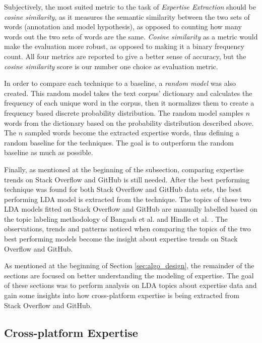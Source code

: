            Subjectively, the most suited metric to the task of \emph{Expertise Extraction} should be \emph{cosine similarity}, as it measures the semantic similarity between the two sets of words (annotation and model hypothesis), as opposed to counting how many words out the two sets of words are the same. \emph{Cosine similarity} as a metric would make the evaluation more robust, as opposed to making it a binary frequency count. All four metrics are reported to give a better sense of accuracy, but the \emph{cosine similarity} score is our number one choice as evaluation metric.
            
            \label{subsec:random_model}In order to compare each technique to a baseline, a \emph{random model} was also created. This random model takes the text corpus' dictionary and calculates the frequency of each unique word in the corpus, then it normalizes them to create a frequency based discrete probability distribution. The random model samples $n$ words from the dictionary based on the probability distribution described above. The $n$ sampled words become the extracted expertise words, thus defining a random baseline for the techniques. The goal is to outperform the random baseline as much as possible.
            
            \label{subsec:topic_labeling}Finally, as mentioned at the beginning of the subsection, comparing expertise trends on Stack Overflow and GitHub is still needed. After the best performing technique was found for both Stack Overflow and GitHub data sets, the best performing LDA model is extracted from the technique. The topics of these two LDA models fitted on Stack Overflow and GitHub are manually labelled based on the topic labeling methodology of Bangash et al. \cite{bangash2019developers} and Hindle et al. \cite{hindle2012relating}. The observations, trends and patterns noticed when comparing the topics of the two best performing models become the insight about expertise trends on Stack Overflow and GitHub.
         
            As mentioned at the beginning of Section \ref{sec:algo_design}, the remainder of the sections are focused on better understanding the modeling of expertise. The goal of these sections was to perform analysis on LDA topics about expertise data and gain some insights into how cross-platform expertise is being extracted from Stack Overflow and GitHub.
    
    \subsection{Cross-platform Expertise\label{RQ2_task}}
    
